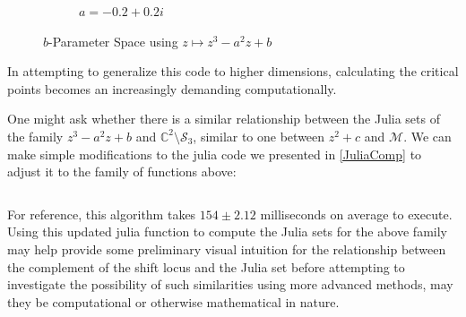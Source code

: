 \documentclass{amsart}
\newcommand{\bbC}{\mathbb{C}}
\newcommand{\cal}[1]{ \mathcal{#1}}
\newcommand{\Shift}[1]{ \mathcal{S}_{#1}}
\newcommand{\Mand}{\cal{M}}
\theoremstyle{definition}
\theoremstyle{remark}
\numberwithin{equation}{section}
\begin{document}
\begin{figure}[h]
\begin{subfigure}{.32\textwidth}
  \caption{$a=-0.2+0.2i$}
\end{subfigure}
\caption{$b$-Parameter Space using $z\mapsto z^3-a^2z+b$}
\label{fig:ShiftLocusA}
\end{figure}



In attempting to generalize this code to higher dimensions, calculating the critical points becomes an increasingly demanding computationally.

 One might ask whether there is a similar relationship between the Julia sets of the family $z^3-a^2z+b$ and $\bbC^2\setminus\Shift{3}$, similar to one between $z^2+c$ and $\Mand$. We can make simple modifications to the julia code we presented in \cref{JuliaComp} to adjust it to the family of functions above:

 \inputminted[mathescape]{python}{code-snippets/Julia3.py}

 For reference, this algorithm takes $154 \pm 2.12$ milliseconds on average to execute. Using this updated julia function to compute the Julia sets for the above family may help provide some preliminary visual intuition for the relationship between the complement of the shift locus and the Julia set before attempting to investigate the possibility of such similarities using more advanced methods, may they be computational or otherwise mathematical in nature.
\end{document}
